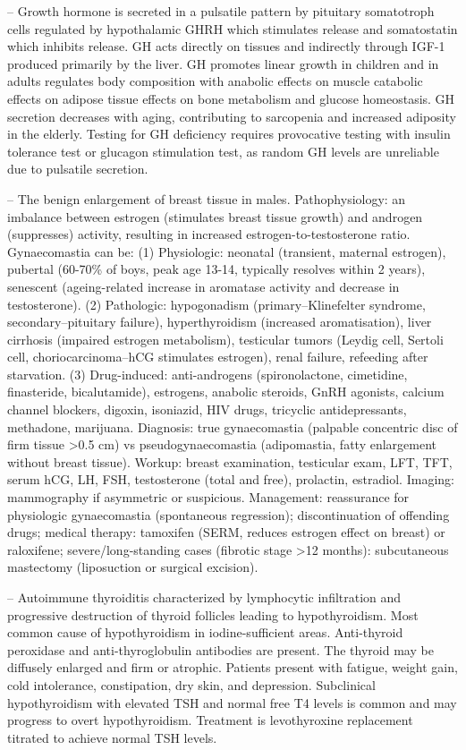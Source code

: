 -- Growth hormone is secreted in a pulsatile pattern by pituitary somatotroph cells regulated by hypothalamic GHRH which stimulates release and somatostatin which inhibits release. GH acts directly on tissues and indirectly through IGF-1 produced primarily by the liver. GH promotes linear growth in children and in adults regulates body composition with anabolic effects on muscle catabolic effects on adipose tissue effects on bone metabolism and glucose homeostasis. GH secretion decreases with aging, contributing to sarcopenia and increased adiposity in the elderly. Testing for GH deficiency requires provocative testing with insulin tolerance test or glucagon stimulation test, as random GH levels are unreliable due to pulsatile secretion.

-- The benign enlargement of breast tissue in males. Pathophysiology: an imbalance between estrogen (stimulates breast tissue growth) and androgen (suppresses) activity, resulting in increased estrogen-to-testosterone ratio. Gynaecomastia can be: (1) Physiologic: neonatal (transient, maternal estrogen), pubertal (60-70\% of boys, peak age 13-14, typically resolves within 2 years), senescent (ageing-related increase in aromatase activity and decrease in testosterone). (2) Pathologic: hypogonadism (primary--Klinefelter syndrome, secondary--pituitary failure), hyperthyroidism (increased aromatisation), liver cirrhosis (impaired estrogen metabolism), testicular tumors (Leydig cell, Sertoli cell, choriocarcinoma--hCG stimulates estrogen), renal failure, refeeding after starvation. (3) Drug-induced: anti-androgens (spironolactone, cimetidine, finasteride, bicalutamide), estrogens, anabolic steroids, GnRH agonists, calcium channel blockers, digoxin, isoniazid, HIV drugs, tricyclic antidepressants, methadone, marijuana. Diagnosis: true gynaecomastia (palpable concentric disc of firm tissue >0.5 cm) vs pseudogynaecomastia (adipomastia, fatty enlargement without breast tissue). Workup: breast examination, testicular exam, LFT, TFT, serum hCG, LH, FSH, testosterone (total and free), prolactin, estradiol. Imaging: mammography if asymmetric or suspicious. Management: reassurance for physiologic gynaecomastia (spontaneous regression); discontinuation of offending drugs; medical therapy: tamoxifen (SERM, reduces estrogen effect on breast) or raloxifene; severe/long-standing cases (fibrotic stage >12 months): subcutaneous mastectomy (liposuction or surgical excision).

-- Autoimmune thyroiditis characterized by lymphocytic infiltration and progressive destruction of thyroid follicles leading to hypothyroidism. Most common cause of hypothyroidism in iodine-sufficient areas. Anti-thyroid peroxidase and anti-thyroglobulin antibodies are present. The thyroid may be diffusely enlarged and firm or atrophic. Patients present with fatigue, weight gain, cold intolerance, constipation, dry skin, and depression. Subclinical hypothyroidism with elevated TSH and normal free T4 levels is common and may progress to overt hypothyroidism. Treatment is levothyroxine replacement titrated to achieve normal TSH levels.

